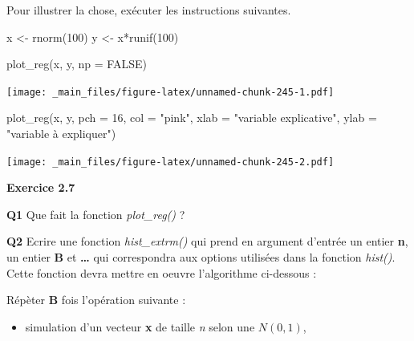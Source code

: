 \documentclass[
]{book}
\newenvironment{Shaded}{\begin{snugshade}}{\end{snugshade}}
\newcommand{\AttributeTok}[1]{\textcolor[rgb]{0.77,0.63,0.00}{#1}}
\newcommand{\ConstantTok}[1]{\textcolor[rgb]{0.00,0.00,0.00}{#1}}
\newcommand{\DecValTok}[1]{\textcolor[rgb]{0.00,0.00,0.81}{#1}}
\newcommand{\FunctionTok}[1]{\textcolor[rgb]{0.00,0.00,0.00}{#1}}
\newcommand{\NormalTok}[1]{#1}
\newcommand{\OtherTok}[1]{\textcolor[rgb]{0.56,0.35,0.01}{#1}}
\newcommand{\SpecialCharTok}[1]{\textcolor[rgb]{0.00,0.00,0.00}{#1}}
\newcommand{\StringTok}[1]{\textcolor[rgb]{0.31,0.60,0.02}{#1}}
\providecommand{\tightlist}{%
  \setlength{\itemsep}{0pt}\setlength{\parskip}{0pt}}
\theoremstyle{definition}
\theoremstyle{definition}
\theoremstyle{definition}
\theoremstyle{definition}
\theoremstyle{remark}
\begin{document}
Pour illustrer la chose, exécuter les instructions suivantes.

\begin{Shaded}
\begin{Highlighting}[]
\NormalTok{x }\OtherTok{\textless{}{-}} \FunctionTok{rnorm}\NormalTok{(}\DecValTok{100}\NormalTok{) }
\NormalTok{y }\OtherTok{\textless{}{-}}\NormalTok{ x}\SpecialCharTok{*}\FunctionTok{runif}\NormalTok{(}\DecValTok{100}\NormalTok{)}
\end{Highlighting}
\end{Shaded}

\begin{Shaded}
\begin{Highlighting}[]
\FunctionTok{plot\_reg}\NormalTok{(x, y, }\AttributeTok{np =} \ConstantTok{FALSE}\NormalTok{)}
\end{Highlighting}
\end{Shaded}

\texttt{[image: \_main\_files/figure-latex/unnamed-chunk-245-1.pdf]}

\begin{Shaded}
\begin{Highlighting}[]
\FunctionTok{plot\_reg}\NormalTok{(x, y, }\AttributeTok{pch =} \DecValTok{16}\NormalTok{, }\AttributeTok{col =} \StringTok{"pink"}\NormalTok{,}
 \AttributeTok{xlab =} \StringTok{"variable explicative"}\NormalTok{, }\AttributeTok{ylab =} \StringTok{"variable à expliquer"}\NormalTok{)}
\end{Highlighting}
\end{Shaded}

\texttt{[image: \_main\_files/figure-latex/unnamed-chunk-245-2.pdf]}

\textbf{Exercice 2.7}

\textbf{Q1} Que fait la fonction \emph{plot\_reg()} ?

\textbf{Q2} Ecrire une fonction \emph{hist\_extrm()} qui prend en argument d'entrée un entier \textbf{n}, un entier \textbf{B} et \textbf{\ldots{}} qui correspondra aux options utilisées dans la fonction \emph{hist()}. Cette fonction devra mettre en oeuvre l'algorithme ci-dessous :

Répèter \textbf{B} fois l'opération suivante :

\begin{itemize}
\tightlist
\item
  simulation d'un vecteur \textbf{x} de taille \emph{n} selon une \(N(0,1)\),
\end{itemize}
\end{document}
